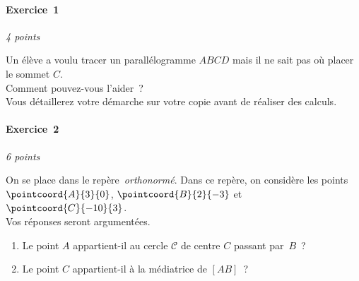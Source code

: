 \begin{minipage}{0.45\textwidth}
\thispagestyle{sujet1}

\vspace*{1em}

\paragraph{Exercice~1} \hfill \emph{4 points}

Un élève a voulu tracer un parallélogramme $ABCD$ mais il ne sait pas où placer le sommet $C$.\\ Comment pouvez-vous l'aider~?\\ Vous détaillerez votre démarche sur votre copie avant de réaliser des calculs.

\begin{center}


\end{center}


\vspace*{2em}

\paragraph{Exercice~2} \hfill \emph{6 points}

On se place dans le repère~\emph{orthonormé}. Dans ce repère, on considère les points $\pointcoord{A}{3}{0}$, $\pointcoord{B}{2}{-3}$ et $\pointcoord{C}{-10}{3}$.\\Vos réponses seront argumentées.

	\begin{enumerate}
		\item Le point $A$ appartient-il au cercle $\mathscr{C}$ de centre $C$ passant par~$B$~?
		\item Le point $C$ appartient-il à la médiatrice de $\left[AB\right]$~?
	\end{enumerate}



\vspace{-2em}


\end{minipage}
\newpage

